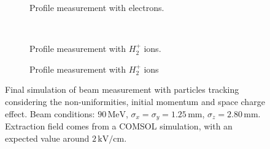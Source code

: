 \begin{figure}[!ht]
	\begin{subfigure}[t]{0.5\textwidth}
		
		\caption[Profile measurement with electrons]{Profile measurement with electrons.}
		\label{chap3:fig:SC_profile_a}
	\end{subfigure}
	~
	\begin{subfigure}[t]{0.5\textwidth}
		
		\caption{Profile measurement with $H^{+}_{2}$ ions}{Profile measurement with $H^{+}_{2}$ ions.}
		\label{chap3:fig:SC_profile_b}
	\end{subfigure}
  \caption[Final simulation of beam measurement with particles tracking considering the non-uniformities, initial momentum and space charge effect]{Final simulation of beam measurement with particles tracking considering the non-uniformities, initial momentum and space charge effect. Beam conditions: $90\,\mathrm{MeV}$, $\sigma_{x}=\sigma_{y}=1.25\,\mathrm{mm}$, $\sigma_{z} = 2.80\,\mathrm{mm}$. Extraction field comes from a COMSOL simulation, with an expected value around $2\,\mathrm{kV/cm}$.}
	\label{chap3:fig:SC_profile}
\end{figure}
